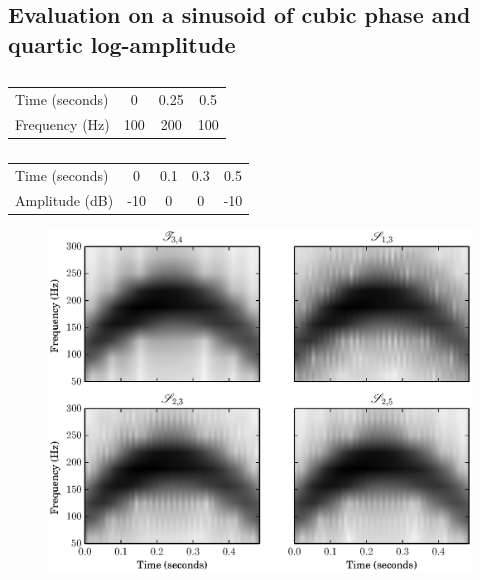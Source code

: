 \subsection{Evaluation on a sinusoid of cubic phase and quartic log-amplitude \label{sec:evalcubicphase}}
\begin{table}
    \caption{\label{tab:cubicsinphparams}}
    \begin{center}
        \begin{tabular}{l|c c c}
            Time (seconds) & 0 & 0.25 & 0.5 \\
            Frequency (Hz) & 100 & 200 & 100
        \end{tabular}
    \end{center}
\end{table}
\begin{table}
    \caption{\label{tab:quarticsinampparams}}
    \begin{center}
        \begin{tabular}{l|c c c c}
            Time (seconds) & 0 & 0.1 & 0.3 & 0.5 \\
            Amplitude (dB) & -10 & 0 & 0 & -10
        \end{tabular}
    \end{center}
\end{table}

\begin{figure}[!t]
    \centering
    \includegraphics[width=\figwidthscale\textwidth]{plots/mq_mod_err_comp_all_spect.eps}
\end{figure}

